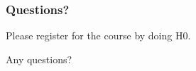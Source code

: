 \begin{assignment}
	\frametitle{Questions?}
	\begin{task}
	Please register for the course by doing H0.
	\end{task}

	\begin{task}
	Any questions?
	\end{task}
\end{assignment}



\nocite{raab2017introducing}

\appendix

\begin{frame}[allowframebreaks]
	
	
\end{frame}




